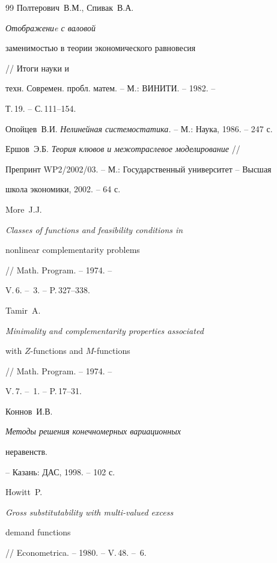 \begin{thebibliography}{99}
Полтерович~В.М., Спивак~В.А. {\it Отображениe с валовой


заменимостью в теории экономического равновесия} // Итоги науки и


техн. Современ. пробл. матем. -- М.: ВИНИТИ. -- 1982. --


Т.\,19. -- С.\,111--154.







Опойцев~В.И. {\it Нелинейная системостатика.} -- М.: Наука, 1986. -- 247 с.







Ершов~Э.Б. {\it Теория клювов и межотраслевое моделирование} //


Препринт WP2/2002/03. -- М.: Государственный университет -- Высшая


школа экономики, 2002. -- 64 с.







More~J.J. {\it Classes of functions and feasibility conditions in


nonlinear complementarity problems} // Math. Program. -- 1974. --


V.\,6. -- \No\,3. -- P.\,327--338.







Tamir~A. {\it Minimality and complementarity properties associated


with $Z$-functions and $M$-functions} // Math. Program. -- 1974. --


V.\,7. -- \No\,1. -- P.\,17--31.







Коннов~И.В. {\it Методы решения конечномерных вариационных


неравенств.} -- Казань: ДАС, 1998. -- 102 с.







Howitt~P. {\it Gross substitutability with multi-valued excess


demand functions} // Econometrica. -- 1980. -- V.\,48. -- \No\,6.



\end{thebibliography}
